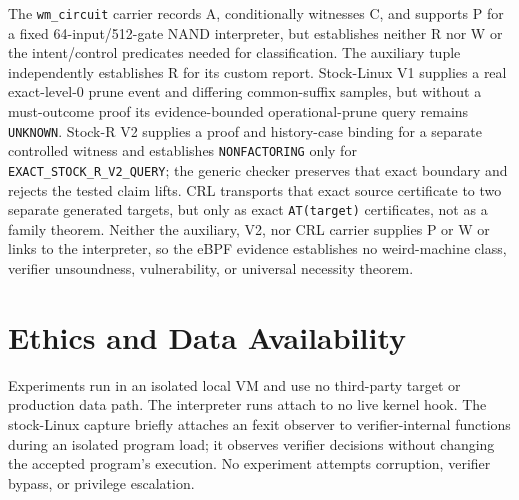 \documentclass[conference]{IEEEtran}
\begin{document}
The \texttt{wm\_circuit} carrier records A, conditionally witnesses C, and supports P for a fixed 64-input/512-gate NAND interpreter, but establishes neither R nor W or the intent/control predicates needed for classification. The auxiliary tuple independently establishes R for its custom report. Stock-Linux V1 supplies a real exact-level-0 prune event and differing common-suffix samples, but without a must-outcome proof its evidence-bounded operational-prune query remains \texttt{UNKNOWN}. Stock-R V2 supplies a proof and history-case binding for a separate controlled witness and establishes \texttt{NONFACTORING} only for \texttt{EXACT\_STOCK\_R\_V2\_QUERY}; the generic checker preserves that exact boundary and rejects the tested claim lifts. CRL transports that exact source certificate to two separate generated targets, but only as exact \texttt{AT(target)} certificates, not as a family theorem. Neither the auxiliary, V2, nor CRL carrier supplies P or W or links to the interpreter, so the eBPF evidence establishes no weird-machine class, verifier unsoundness, vulnerability, or universal necessity theorem.

\section*{Ethics and Data Availability}

Experiments run in an isolated local VM and use no third-party target or production data path. The interpreter runs attach to no live kernel hook. The stock-Linux capture briefly attaches an fexit observer to verifier-internal functions during an isolated program load; it observes verifier decisions without changing the accepted program's execution. No experiment attempts corruption, verifier bypass, or privilege escalation.
\end{document}
